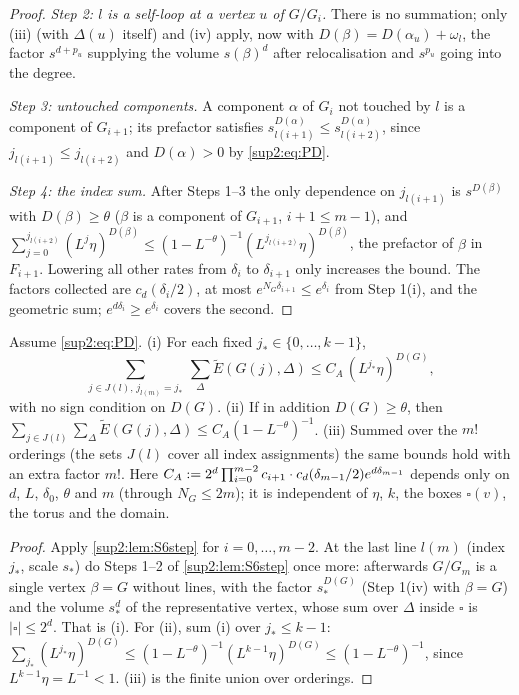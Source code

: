 \begin{proof}
\emph{Step 2: $l$ is a self-loop at a vertex $u$ of $G/G_i$.} There is no summation; only (iii) (with $\Delta(u)$ itself) and (iv) apply, now with $D(\beta)=D(\alpha_u)+\omega_l$, the factor $s^{d+p_u}$ supplying the volume $s(\beta)^d$ after relocalisation and $s^{p_u}$ going into the degree.

\emph{Step 3: untouched components.} A component $\alpha$ of $G_i$ not touched by $l$ is a component of $G_{i+1}$; its prefactor satisfies $s_{l(i+1)}^{D(\alpha)}\le s_{l(i+2)}^{D(\alpha)}$, since $j_{l(i+1)}\le j_{l(i+2)}$ and $D(\alpha)>0$ by \eqref{sup2:eq:PD}.

\emph{Step 4: the index sum.} After Steps 1--3 the only dependence on $j_{l(i+1)}$ is $s^{D(\beta)}$ with $D(\beta)\ge\theta$ ($\beta$ is a component of $G_{i+1}$, $i+1\le m-1$), and $\sum_{j=0}^{j_{l(i+2)}}(L^j\eta)^{D(\beta)}\le(1-L^{-\theta})^{-1}(L^{j_{l(i+2)}}\eta)^{D(\beta)}$, the prefactor of $\beta$ in $F_{i+1}$. Lowering all other rates from $\delta_i$ to $\delta_{i+1}$ only increases the bound. The factors collected are $c_d(\delta_i/2)$, at most $e^{N_G\delta_{i+1}}\le e^{\delta_i}$ from Step 1(i), and the geometric sum; $e^{d\delta_i}\ge e^{\delta_i}$ covers the second.
\end{proof}

\begin{theorem}\label{sup2:thm:S6}
Assume \eqref{sup2:eq:PD}. \textup{(i)} For each fixed $j_*\in\{0,\dots,k-1\}$,
\[
\sum_{j\in J(l),\,j_{l(m)}=j_*}\ \sum_\Delta\tilde E(G(j),\Delta)\le C_A\,(L^{j_*}\eta)^{D(G)},
\]
with no sign condition on $D(G)$. \textup{(ii)} If in addition $D(G)\ge\theta$, then $\sum_{j\in J(l)}\sum_\Delta\tilde E(G(j),\Delta)\le C_A(1-L^{-\theta})^{-1}$. \textup{(iii)} Summed over the $m!$ orderings (the sets $J(l)$ cover all index assignments) the same bounds hold with an extra factor $m!$. Here $C_A:=2^d\prod_{i=0}^{m-2}c_{i+1}\cdot c_d(\delta_{m-1}/2)e^{d\delta_{m-1}}$ depends only on $d$, $L$, $\delta_0$, $\theta$ and $m$ (through $N_G\le2m$); it is independent of $\eta$, $k$, the boxes $\square(v)$, the torus and the domain.
\end{theorem}

\begin{proof}
Apply \cref{sup2:lem:S6step} for $i=0,\dots,m-2$. At the last line $l(m)$ (index $j_*$, scale $s_*$) do Steps 1--2 of \cref{sup2:lem:S6step} once more: afterwards $G/G_m$ is a single vertex $\beta=G$ without lines, with the factor $s_*^{D(G)}$ (Step 1(iv) with $\beta=G$) and the volume $s_*^d$ of the representative vertex, whose sum over $\Delta$ inside $\square$ is $|\square|\le2^d$. That is (i). For (ii), sum (i) over $j_*\le k-1$: $\sum_{j_*}(L^{j_*}\eta)^{D(G)}\le(1-L^{-\theta})^{-1}(L^{k-1}\eta)^{D(G)}\le(1-L^{-\theta})^{-1}$, since $L^{k-1}\eta=L^{-1}<1$. (iii) is the finite union over orderings.
\end{proof}

